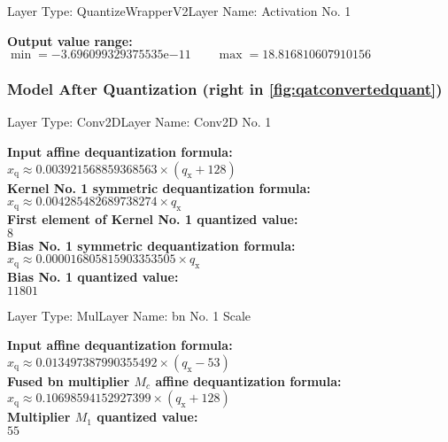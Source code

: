 {\begin{layerbox}{Layer Type: QuantizeWrapperV2}{Layer Name: Activation No. 1}
  \begin{center}
    \textbf{Output value range:} \\[2pt]
    $\min = -3.696099329375535 \mathrm{e}{-11} \quad\quad \max = 18.816810607910156$
  \end{center}
\end{layerbox}

\clearpage
\subsubsection*{Model After Quantization (right in \autoref{fig:qatconvertedquant})}

\begin{layerbox}{Layer Type: Conv2D}{Layer Name: Conv2D No. 1}
  \begin{center}
    \textbf{Input affine dequantization formula:} \\[2pt]
    $x_{\text{q}} \approx 0.003921568859368563 \times (q_{\text{x}} + 128)$ \\[6pt]
    \textbf{Kernel No. 1 symmetric dequantization formula:} \\[2pt]
    $x_{\text{q}} \approx 0.004285482689738274 \times q_{\text{x}}$ \\[6pt]
    \textbf{First element of Kernel No. 1 quantized value:} \\[2pt]
    $8$ \\[6pt]
    \textbf{Bias No. 1 symmetric dequantization formula:} \\[2pt]
    $x_{\text{q}} \approx 0.000016805815903353505 \times q_{\text{x}}$ \\[6pt]
    \textbf{Bias No. 1 quantized value:} \\[2pt]
    $11801$ \\[6pt]
  \end{center}
\end{layerbox}

\begin{layerbox}{Layer Type: Mul}{Layer Name: \gls{bn} No. 1 Scale}
  \begin{center}
    \textbf{Input affine dequantization formula:} \\[2pt]
    $x_{\text{q}} \approx 0.013497387990355492 \times (q_{\text{x}} - 53)$ \\[6pt]
    \textbf{Fused \gls{bn} multiplier $M_c$ affine dequantization formula:} \\[2pt]
    $x_{\text{q}} \approx 0.10698594152927399 \times (q_{\text{x}} + 128)$ \\[6pt]
    \textbf{Multiplier $M_1$ quantized value:} \\[2pt]
    $55$ \\[6pt]
  \end{center}
\end{layerbox}

}
